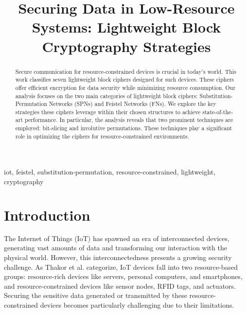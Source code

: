 \documentclass[conference]{IEEEtran}
\begin{document}
\title{Securing Data in Low-Resource Systems: Lightweight Block Cryptography Strategies}


\author{
\and
{}
}


\maketitle

\begin{abstract}
    Secure communication for resource-constrained devices is crucial in today's world. This work classifies seven lightweight block ciphers designed for such devices. These ciphers offer efficient encryption for data security while minimizing resource consumption. Our analysis focuses on the two main categories of lightweight block ciphers: Substitution-Permutation Networks (SPNs) and Feistel Networks (FNs). We explore the key strategies these ciphers leverage within their chosen structures to achieve state-of-the-art performance. In particular, the analysis reveals that two prominent techniques are employed: bit-slicing and involutive permutations. These techniques play a significant role in optimizing the ciphers for resource-constrained environments.
\end{abstract}

\begin{IEEEkeywords}
iot, feistel, substitution-permutation, resource-constrained, lightweight, cryptography
\end{IEEEkeywords}

\section{Introduction}

The Internet of Things (IoT) has spawned an era of interconnected devices, generating vast amounts of data and transforming our interaction with the physical world. However, this interconnectedness presents a growing security challenge. As Thakor et al. \cite{IoT_1} categorize, IoT devices fall into two resource-based groups: resource-rich devices like servers, personal computers, and smartphones, and resource-constrained devices like sensor nodes, RFID tags, and actuators. Securing the sensitive data generated or transmitted by these resource-constrained devices becomes particularly challenging due to their limitations.
\end{document}
